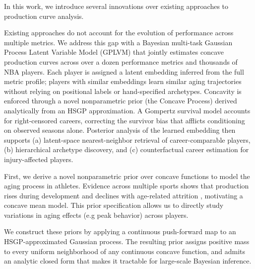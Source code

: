\documentclass[aoas]{imsart}
\begin{document}

In this work, we introduce several innovations over existing approaches to production curve analysis.  
%
%
%

Existing approaches do not account for the evolution of performance across multiple metrics. We address this gap with a Bayesian multi-task Gaussian Process Latent Variable Model (GPLVM) that jointly estimates concave production curves across over a dozen performance metrics and thousands of NBA players.  Each player is assigned a latent embedding inferred from the full metric profile; players with similar embeddings learn similar aging trajectories without relying on positional labels or hand-specified archetypes.  Concavity is enforced through a novel nonparametric prior (the Concave Process) derived analytically from an HSGP approximation.  A Gompertz survival model accounts for right-censored careers, correcting the survivor bias that afflicts conditioning on observed seasons alone.  Posterior analysis of the learned embedding then supports (a) latent-space nearest-neighbor retrieval of career-comparable players, (b) hierarchical archetype discovery, and (c) counterfactual career estimation for injury-affected players.

First, we derive a novel nonparametric prior over concave functions to model the aging process in athletes. Evidence across multiple sports shows that production rises during development and declines with age-related attrition \citep[see e.g.][]{vaci2019large}, motivating a concave mean model. This prior specification allows us to directly study variations in aging effects (e.g peak behavior) across players. 

We construct these priors by applying a continuous push-forward map to an HSGP-approximated Gaussian process.  The resulting prior assigns positive mass to every uniform neighborhood of any continuous concave function, and admits an analytic closed form that makes it tractable for large-scale Bayesian inference.
\end{document}

